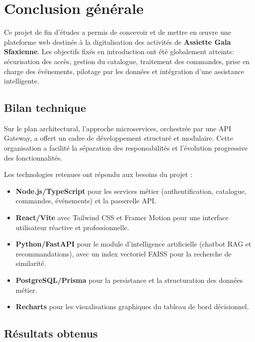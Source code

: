 \chapter*{\centering Conclusion générale}

Ce projet de fin d'études a permis de concevoir et de mettre en œuvre une plateforme web destinée à la digitalisation des activités de \textbf{Assiette Gala Sfaxienne}. Les objectifs fixés en introduction ont été globalement atteints: sécurisation des accès, gestion du catalogue, traitement des commandes, prise en charge des événements, pilotage par les données et intégration d'une assistance intelligente.

\section*{Bilan technique}

Sur le plan architectural, l'approche microservices, orchestrée par une API Gateway, a offert un cadre de développement structuré et modulaire. Cette organisation a facilité la séparation des responsabilités et l'évolution progressive des fonctionnalités.

Les technologies retenues ont répondu aux besoins du projet :
\begin{itemize}
    \item \textbf{Node.js/TypeScript} pour les services métier (authentification, catalogue, commandes, événements) et la passerelle API.
    \item \textbf{React/Vite} avec Tailwind CSS et Framer Motion pour une interface utilisateur réactive et professionnelle.
    \item \textbf{Python/FastAPI} pour le module d'intelligence artificielle (chatbot RAG et recommandations), avec un index vectoriel FAISS pour la recherche de similarité.
    \item \textbf{PostgreSQL/Prisma} pour la persistance et la structuration des données métier.
    \item \textbf{Recharts} pour les visualisations graphiques du tableau de bord décisionnel.
\end{itemize}

\section*{Résultats obtenus}

